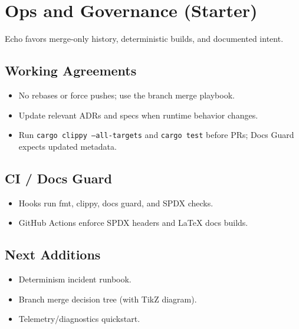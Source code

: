 
\chapter{Ops and Governance (Starter)}

Echo favors merge-only history, deterministic builds, and documented intent.

\section{Working Agreements}
\begin{itemize}
    \item No rebases or force pushes; use the branch merge playbook.
    \item Update relevant ADRs and specs when runtime behavior changes.
    \item Run \texttt{cargo clippy --all-targets} and \texttt{cargo test} before PRs; Docs Guard expects updated metadata.
\end{itemize}

\section{CI / Docs Guard}
\begin{itemize}
    \item Hooks run fmt, clippy, docs guard, and SPDX checks.
    \item GitHub Actions enforce SPDX headers and LaTeX docs builds.
\end{itemize}

\section{Next Additions}
\begin{itemize}
    \item Determinism incident runbook.
    \item Branch merge decision tree (with TikZ diagram).
    \item Telemetry/diagnostics quickstart.
\end{itemize}
